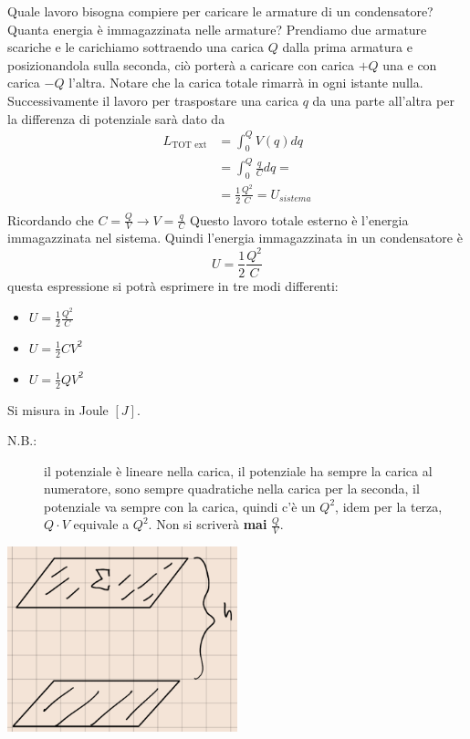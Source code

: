 \documentclass[a4paper, 12pt]{book}
\theoremstyle{plain}
\begin{document}
Quale lavoro bisogna compiere per caricare le armature 
di un condensatore? Quanta energia è immagazzinata nelle 
armature? Prendiamo due armature scariche e le carichiamo 
sottraendo una carica $Q$ dalla prima armatura e posizionandola
sulla seconda, ciò porterà a caricare con carica $+Q$ una 
e con carica $-Q$ l'altra. Notare che la carica totale 
rimarrà in ogni istante nulla. Successivamente il lavoro 
per traspostare una carica $q$ da una parte all'altra per 
la differenza di potenziale sarà dato da 
\[ 
    \begin{split}
        L_{\textrm{TOT ext}} &= \int_0^Q V(q) dq \\
        &= \int_0^Q \frac{q}{C} dq = \\
        &= \frac{1}{2} \frac{Q^2}{C} = U_{sistema} \\
    \end{split}
\] 
Ricordando che $C = \frac{Q}{V} \rightarrow V = \frac{q}{C}$
Questo lavoro totale esterno è l'energia immagazzinata 
nel sistema. Quindi l'energia immagazzinata in un condensatore 
è \[ U = \frac{1}{2} \frac{Q^2}{C} \] questa espressione 
si potrà esprimere in tre modi differenti: 
\begin{itemize}
    \item $U = \frac{1}{2} \frac{Q^2}{C}$
    \item $U = \frac{1}{2} CV^2$
    \item $U = \frac{1}{2} QV^2$
\end{itemize}
Si misura in Joule $[J]$. 
\begin{description}
    \item[N.B.:]  il potenziale è lineare nella carica, il potenziale ha
    sempre la carica al numeratore, sono sempre quadratiche nella carica 
    per la seconda, il potenziale va sempre con la carica, quindi 
    c'è un $Q^2$, idem per la terza, $Q\cdot V$ equivale a 
    $Q^2$. Non si scriverà \textbf{mai} $\frac{Q}{V}$.
\end{description}
\begin{center}
    \includegraphics[width=0.5\textwidth]{lastre.png}
\end{center}
\end{document}
